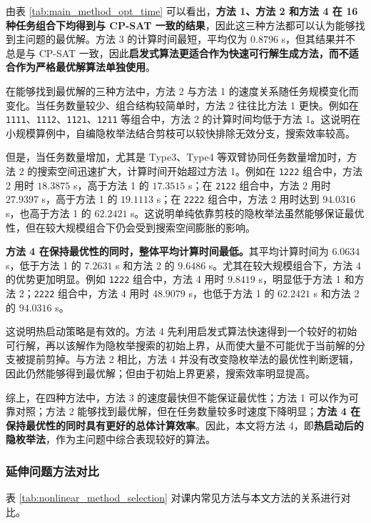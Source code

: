 由表 \ref{tab:main_method_opt_time} 可以看出，\textbf{方法 1、方法 2 和方法 4 在 16 种任务组合下均得到与 CP-SAT 一致的结果}，因此这三种方法都可以认为能够找到主问题的最优解。方法 3 的计算时间最短，平均仅为 $0.8796$ s，但其结果并不总是与 CP-SAT 一致，因此\textbf{启发式算法更适合作为快速可行解生成方法，而不适合作为严格最优解算法单独使用}。

在能够找到最优解的三种方法中，方法 2 与方法 1 的速度关系随任务规模变化而变化。当任务数量较少、组合结构较简单时，方法 2 往往比方法 1 更快。例如在 \texttt{1111}、\texttt{1112}、\texttt{1121}、\texttt{1211} 等组合中，方法 2 的计算时间均低于方法 1。这说明在小规模算例中，自编隐枚举法结合剪枝可以较快排除无效分支，搜索效率较高。

但是，当任务数量增加，尤其是 Type3、Type4 等双臂协同任务数量增加时，方法 2 的搜索空间迅速扩大，计算时间开始超过方法 1。例如在 \texttt{1222} 组合中，方法 2 用时 $18.3875$ s，高于方法 1 的 $17.3515$ s；在 \texttt{2122} 组合中，方法 2 用时 $27.9397$ s，高于方法 1 的 $19.1113$ s；在 \texttt{2222} 组合中，方法 2 用时达到 $94.0316$ s，也高于方法 1 的 $62.2421$ s。这说明单纯依靠剪枝的隐枚举法虽然能够保证最优性，但在较大规模组合下仍会受到搜索空间膨胀的影响。

\textbf{方法 4 在保持最优性的同时，整体平均计算时间最低。}其平均计算时间为 $6.0634$ s，低于方法 1 的 $7.2631$ s 和方法 2 的 $9.6486$ s。尤其在较大规模组合下，方法 4 的优势更加明显。例如 \texttt{1222} 组合中，方法 4 用时 $9.8419$ s，明显低于方法 1 和方法 2；\texttt{2222} 组合中，方法 4 用时 $48.9079$ s，也低于方法 1 的 $62.2421$ s 和方法 2 的 $94.0316$ s。

这说明热启动策略是有效的。方法 4 先利用启发式算法快速得到一个较好的初始可行解，再以该解作为隐枚举搜索的初始上界，从而使大量不可能优于当前解的分支被提前剪掉。与方法 2 相比，方法 4 并没有改变隐枚举法的最优性判断逻辑，因此仍然能够得到最优解；但由于初始上界更紧，搜索效率明显提高。

综上，在四种方法中，方法 3 的速度最快但不能保证最优性；方法 1 可以作为可靠对照；方法 2 能够找到最优解，但在任务数量较多时速度下降明显；\textbf{方法 4 在保持最优性的同时具有更好的总体计算效率}。因此，本文将方法 4，即\textbf{热启动后的隐枚举法}，作为主问题中综合表现较好的算法。



\subsubsection{延伸问题方法对比}

表 \ref{tab:nonlinear_method_selection} 对课内常见方法与本文方法的关系进行对比。

